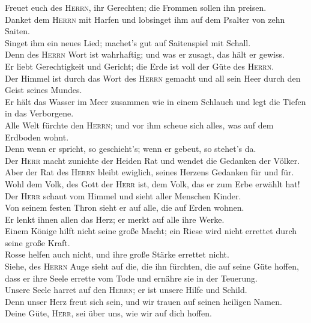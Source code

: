  Freuet euch des \textsc{Herrn}, ihr Gerechten; die
Frommen sollen ihn preisen.\\
 Danket dem \textsc{Herrn} mit Harfen und lobsinget ihm
auf dem Psalter von zehn Saiten.\\
 Singet ihm ein neues Lied; machet's gut auf Saitenspiel
mit Schall.\\
 Denn des \textsc{Herrn} Wort ist wahrhaftig; und was er
zusagt, das hält er gewiss.\\
 Er liebt Gerechtigkeit und Gericht; die Erde ist voll der
Güte des \textsc{Herrn}.\\
 Der Himmel ist durch das Wort des \textsc{Herrn} gemacht
und all sein Heer durch den Geist seines Mundes.\\
 Er hält das Wasser im Meer zusammen wie in einem Schlauch
und legt die Tiefen in das Verborgene.\\
 Alle Welt fürchte den \textsc{Herrn}; und vor ihm scheue
sich alles, was auf dem Erdboden wohnt.\\
 Denn wenn er spricht, so geschieht's; wenn er gebeut, so
stehet's da.\\
 Der \textsc{Herr} macht zunichte der Heiden Rat und
wendet die Gedanken der Völker.\\
 Aber der Rat des \textsc{Herrn} bleibt ewiglich, seines
Herzens Gedanken für und für.\\
 Wohl dem Volk, des Gott der \textsc{Herr} ist, dem Volk,
das er zum Erbe erwählt hat!\\
 Der \textsc{Herr} schaut vom Himmel und sieht aller
Menschen Kinder.\\
 Von seinem festen Thron sieht er auf alle, die auf Erden
wohnen.\\
 Er lenkt ihnen allen das Herz; er merkt auf alle ihre
Werke.\\
 Einem Könige hilft nicht seine große Macht; ein Riese
wird nicht errettet durch seine große Kraft.\\
 Rosse helfen auch nicht, und ihre große Stärke errettet
nicht.\\
 Siehe, des \textsc{Herrn} Auge sieht auf die, die ihn
fürchten, die auf seine Güte hoffen,\\
 dass er ihre Seele errette vom Tode und ernähre sie in
der Teuerung.\\
 Unsere Seele harret auf den \textsc{Herrn}; er ist
unsere Hilfe und Schild.\\
 Denn unser Herz freut sich sein, und wir trauen auf
seinen heiligen Namen.\\
 Deine Güte, \textsc{Herr}, sei über uns, wie wir auf
dich hoffen.

